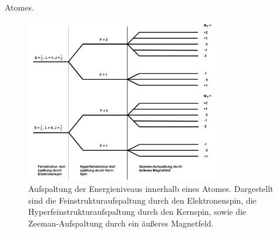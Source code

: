 \documentclass[
  bibliography=totoc,     %
  captions=tableheading,  %
  titlepage=firstiscover, %
]{scrartcl}
\begin{document}
Atomes.
%
\begin{figure}[h]
  \centering
  \includegraphics[width=0.75\textwidth]{Aufspaltung.jpg}
  \caption{Aufspaltung der Energieniveaus innerhalb eines Atomes. Dargestellt
  sind die Feinstrukturaufspaltung durch den Elektronenspin, die
  Hyperfeinstrukturaufspaltung durch den Kernspin, sowie die Zeeman-Aufspaltung
  durch ein äußeres Magnetfeld. \cite{anleitung}}
  \label{fig:aufspaltung}
\end{figure}
\end{document}
